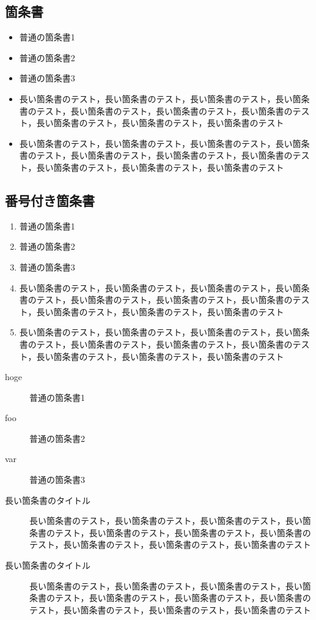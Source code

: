 \documentclass[twocolumn]{jarticle} %
\begin{document}
\subsection{箇条書}

\begin{itemize}
  \item 普通の箇条書1
  \item 普通の箇条書2
  \item 普通の箇条書3
  \item 長い箇条書のテスト，長い箇条書のテスト，長い箇条書のテスト，長い箇条書のテスト，長い箇条書のテスト，長い箇条書のテスト，長い箇条書のテスト，長い箇条書のテスト，長い箇条書のテスト，長い箇条書のテスト
  \item 長い箇条書のテスト，長い箇条書のテスト，長い箇条書のテスト，長い箇条書のテスト，長い箇条書のテスト，長い箇条書のテスト，長い箇条書のテスト，長い箇条書のテスト，長い箇条書のテスト，長い箇条書のテスト
\end{itemize}

\subsection{番号付き箇条書}

\begin{enumerate}
  \item 普通の箇条書1
  \item 普通の箇条書2
  \item 普通の箇条書3
  \item 長い箇条書のテスト，長い箇条書のテスト，長い箇条書のテスト，長い箇条書のテスト，長い箇条書のテスト，長い箇条書のテスト，長い箇条書のテスト，長い箇条書のテスト，長い箇条書のテスト，長い箇条書のテスト
  \item 長い箇条書のテスト，長い箇条書のテスト，長い箇条書のテスト，長い箇条書のテスト，長い箇条書のテスト，長い箇条書のテスト，長い箇条書のテスト，長い箇条書のテスト，長い箇条書のテスト，長い箇条書のテスト
\end{enumerate}

\begin{description}
  \item[hoge] 普通の箇条書1
  \item[foo] 普通の箇条書2
  \item[var] 普通の箇条書3
  \item[長い箇条書のタイトル] 長い箇条書のテスト，長い箇条書のテスト，長い箇条書のテスト，長い箇条書のテスト，長い箇条書のテスト，長い箇条書のテスト，長い箇条書のテスト，長い箇条書のテスト，長い箇条書のテスト，長い箇条書のテスト
  \item[長い箇条書のタイトル] 長い箇条書のテスト，長い箇条書のテスト，長い箇条書のテスト，長い箇条書のテスト，長い箇条書のテスト，長い箇条書のテスト，長い箇条書のテスト，長い箇条書のテスト，長い箇条書のテスト，長い箇条書のテスト
\end{description}
\end{document}
